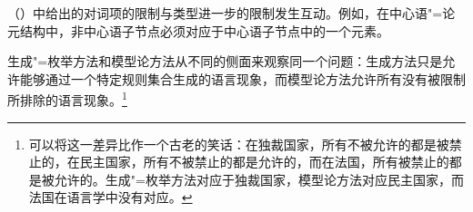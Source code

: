 
（）中给出的对词项的限制与类型进一步的限制发生互动。例如，在中心语"=论元结构中，非中心语子节点必须对应于中心语子节点\subcatlc 中的一个元素。

\addlines[-1]
生成"=枚举方法和模型论方法从不同的侧面来观察同一个问题：生成方法只是允许能够通过一个特定规则集合生成的语言现象，而模型论方法允许所有没有被限制所排除的语言现象。\footnote{
可以将这一差异比作一个古老的笑话：在独裁国家，所有不被允许的都是被禁止的，在民主国家，所有不被禁止的都是允许的，而在法国，所有被禁止的都是被允许的。生成"=枚举方法对应于独裁国家，模型论方法对应民主国家，而法国在语言学中没有对应。
}

